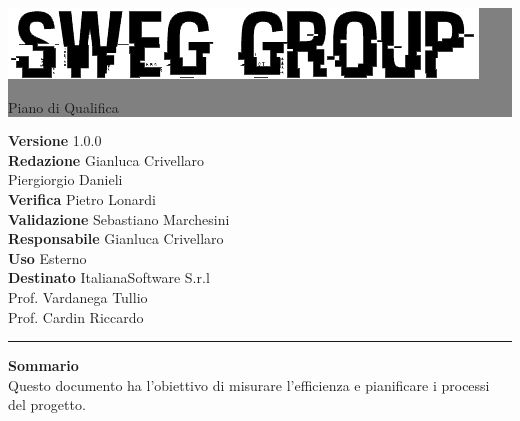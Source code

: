 \documentclass[12pt,a4paper,titlepage]{article}
\newcommand{\HRule}[1]{\hfill \rule{0.2\linewidth}{#1}} %
\begin{document}
	
	\thispagestyle{empty} %
	
	
	\colorbox{grey}{
		\parbox[t]{1.0\linewidth}{
			\centering \fontsize{50pt}{80pt}\selectfont %
			\vspace*{0.7cm} %
			
			\raggedleft
			\includegraphics[width=0.7\linewidth]{../../LogoSWEgGroupSFONDOVUOTO}
			
			\hfill Piano di Qualifica \\
			
			\vspace*{0.7cm} %
		}
	}
	
	
	\vfill %
	
	
	{\centering \large 
		\hfill \textbf{Versione} 1.0.0 \\
		\hfill \textbf{Redazione} Gianluca Crivellaro \\
		\hfill Piergiorgio Danieli \\
		\hfill \textbf{Verifica} Pietro Lonardi \\
		\hfill \textbf{Validazione} Sebastiano Marchesini \\
		\hfill \textbf{Responsabile} Gianluca Crivellaro \\
		\hfill \textbf{Uso} Esterno \\
		\hfill \textbf{Destinato} ItalianaSoftware S.r.l \\
		\hfill Prof. Vardanega Tullio \\
		\hfill Prof. Cardin Riccardo \\ 
		
		\HRule{1pt}
		
		\textbf{Sommario} \\
		Questo documento ha l'obiettivo di misurare l'efficienza e pianificare i processi del progetto.
		
	} %
	
\end{document}
